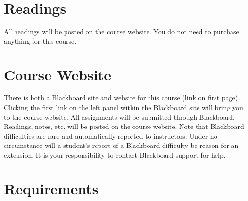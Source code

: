 \documentclass[article,oneside]{memoir}
\begin{document}
\section{Readings}

All readings will be posted on the course website. You do not need to purchase anything for this course. 


\section{Course Website}
There is both a Blackboard site and website for this course (link on first page). Clicking the first link on the left panel within the Blackboard site will bring you to the course website. All assignments will be submitted through Blackboard. Readings, notes, etc. will be posted on the course website. Note that Blackboard difficulties are rare and automatically reported to instructors. Under no circumstance will a student's report of a Blackboard difficulty be reason for an extension. It is your responsibility to contact Blackboard support for help.


\section{Requirements}
\end{document}
